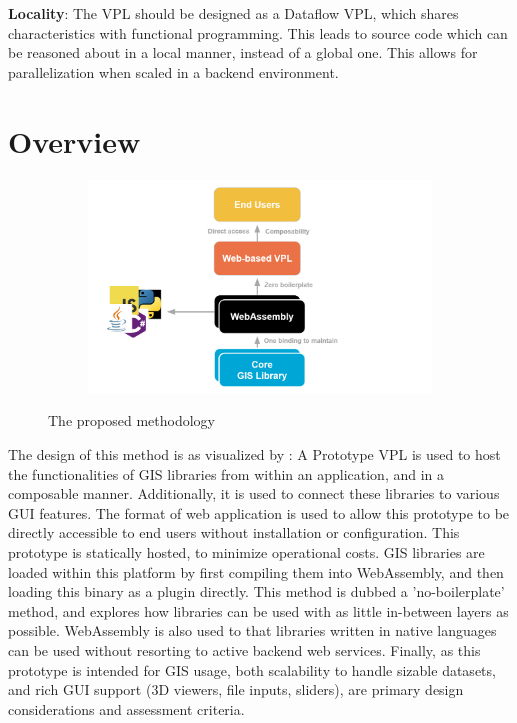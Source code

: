 \textbf{Locality}: The VPL should be designed as a Dataflow VPL, which shares characteristics with functional programming. This leads to source code which can be reasoned about in a local manner, instead of a global one. This allows for parallelization when scaled in a backend environment.


\section{Overview}

\graphicspath{{../../assets/images/1/}}

\begin{figure}
  \centering
  \begin{subfigure}[b]{0.80\linewidth}
    \centering
    \includegraphics[width=\linewidth]{proposal.png}
  \end{subfigure}%
  \caption{The proposed methodology}
  \label{fig:proposal}
\end{figure}

The design of this method is as visualized by : 
A Prototype VPL is used to host the functionalities of \ac{GIS} libraries from within an application, and in a composable manner. Additionally, it is used to connect these libraries to various \ac{GUI} features. 
The format of web application is used to allow this prototype to be directly accessible to end users without installation or configuration. 
This prototype is statically hosted, to minimize operational costs.
\ac{GIS} libraries are loaded within this platform by first compiling them into WebAssembly, and then loading this binary as a plugin directly. 
This method is dubbed a 'no-boilerplate' method, and explores how libraries can be used with as little in-between layers as possible.
WebAssembly is also used to that libraries written in native languages can be used without resorting to active backend web services. 
Finally, as this prototype is intended for \ac{GIS} usage, both scalability to handle sizable datasets, and rich \ac{GUI} support (3D viewers, file inputs, sliders), are primary design considerations and assessment criteria. 


